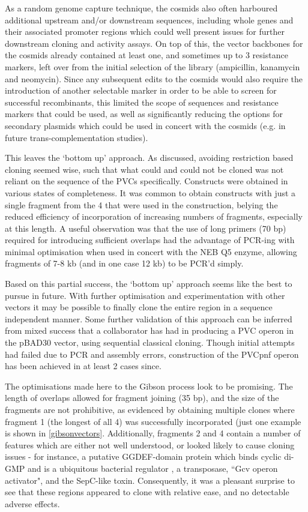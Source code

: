 As a random genome capture technique, the cosmids also often harboured additional upstream and/or downstream sequences, including whole genes and their associated promoter regions which could well present issues for further downstream cloning and activity assays. On top of this, the vector backbones for the cosmids already contained at least one, and sometimes up to 3 resistance markers, left over from the initial selection of the library (ampicillin, kanamycin and neomycin). Since any subsequent edits to the cosmids would also require the introduction of another selectable marker in order to be able to screen for successful recombinants, this limited the scope of sequences and resistance markers that could be used, as well as significantly reducing the options for secondary plasmids which could be used in concert with the cosmids (e.g. in future trans-complementation studies).

This leaves the `bottom up' approach. As discussed, avoiding restriction based cloning seemed wise, such that what could and could not be cloned was not reliant on the sequence of the PVCs specifically. Constructs were obtained in various states of completeness. It was common to obtain constructs with just a single fragment from the 4 that were used in the construction, belying the reduced efficiency of incorporation of increasing numbers of fragments, especially at this length. A useful observation was that the use of long primers (70 bp) required for introducing sufficient overlaps had the advantage of PCR-ing with minimal optimisation when used in concert with the NEB Q5 enzyme, allowing fragments of 7-8 kb (and in one case 12 kb) to be PCR'd simply.

Based on this partial success, the `bottom up' approach seems like the best to pursue in future. With further optimisation and experimentation with other vectors it may be possible to finally clone the entire region in a sequence independent manner. Some further validation of this approach can be inferred from mixed success that a collaborator has had in producing a PVC operon in the pBAD30 vector, using sequential classical cloning. Though initial attempts had failed due to PCR and assembly errors, construction of the PVCpnf operon has been achieved in at least 2 cases since.

The optimisations made here to the Gibson process look to be promising. The length of overlaps allowed for fragment joining (35 bp), and the size of the fragments are not prohibitive, as evidenced by obtaining multiple clones where fragment 1 (the longest of all 4) was successfully incorporated (just one example is shown in \vref{gibsonvectors}. Additionally, fragments 2 and 4 contain a number of features which are either not well understood, or looked likely to cause cloning issues - for instance, a putative GGDEF-domain protein which binds cyclic di-GMP and is a ubiquitous bacterial regulator \citep{Paul2004a}, a transposase, ``Gcv operon activator", and the SepC-like toxin. Consequently, it was a pleasant surprise to see that these regions appeared to clone with relative ease, and no detectable adverse effects.

